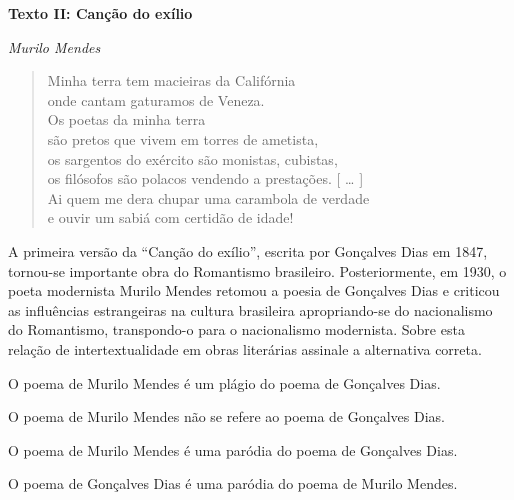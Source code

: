 \begin{myquote}

\textbf{Texto II: Canção do exílio}

\emph{Murilo Mendes}

\begin{verse}

Minha terra tem macieiras da Califórnia \\

onde cantam gaturamos de Veneza. \\

Os poetas da minha terra \\

são pretos que vivem em torres de ametista, \\

os sargentos do exército são monistas, cubistas, \\

os filósofos são polacos vendendo a prestações. {[} \ldots{} {]} \\

Ai quem me dera chupar uma carambola de verdade \\

e ouvir um sabiá com certidão de idade!

\end{verse}

\end{myquote}


A primeira versão da ``Canção do exílio'', escrita por Gonçalves Dias em 1847, tornou-se
importante obra do Romantismo brasileiro. Posteriormente, em 1930, o
poeta modernista Murilo Mendes retomou a poesia de Gonçalves Dias e
criticou as influências estrangeiras na cultura brasileira
apropriando-se do nacionalismo do Romantismo, transpondo-o para o
nacionalismo modernista. Sobre esta relação de
intertextualidade em obras literárias assinale a alternativa correta.

\begin{escolha}

  \item O poema de Murilo Mendes é um plágio do poema de Gonçalves Dias.

  \item O poema de Murilo Mendes não se refere ao poema de Gonçalves Dias.

  \item O poema de Murilo Mendes é uma paródia do poema de Gonçalves Dias.

  \item O poema de Gonçalves Dias é uma paródia do poema de Murilo Mendes.

\end{escolha}

